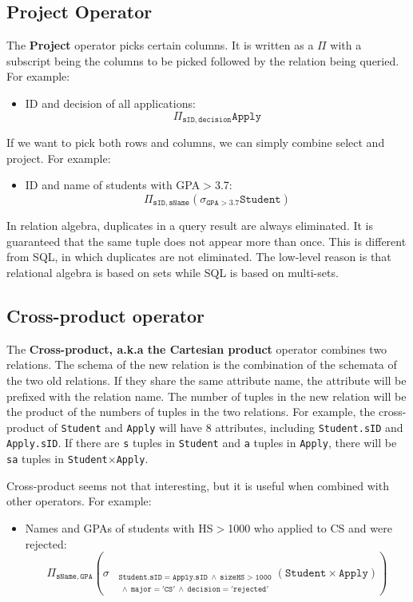 \subsection{Project Operator}
The \textbf{Project} operator picks certain columns. It is written as a $\Pi$ with a subscript being the columns to be picked followed by the relation being queried. For example:
\begin{itemize}
\item ID and decision of all applications: $$\mathtt{\Pi_{sID, decision}Apply}$$
\end{itemize}
If we want to pick both rows and columns, we can simply combine select and project. For example:
\begin{itemize}
\item ID and name of students with GPA$>$3.7:$$\mathtt{\Pi_{sID,sName}\left(\sigma_{GPA>3.7}Student\right)}$$
\end{itemize}
In relation algebra, duplicates in a query result are always eliminated. It is guaranteed that the same tuple does not appear more than once. This is different from SQL, in which duplicates are not eliminated. The low-level reason is that relational algebra is based on sets while SQL is based on multi-sets.
\subsection{Cross-product operator}
The \textbf{Cross-product, a.k.a the Cartesian product} operator combines two relations. The schema of the new relation is the combination of the schemata of the two old relations. If they share the same attribute name, the attribute will be prefixed with the relation name. The number of tuples in the new relation will be the product of the numbers of tuples in the two relations. For example, the cross-product of \texttt{Student} and \texttt{Apply} will have 8 attributes, including \texttt{Student.sID} and \texttt{Apply.sID}. If there are \texttt{s} tuples in \texttt{Student} and \texttt{a} tuples in \texttt{Apply}, there will be \texttt{sa} tuples in \texttt{Student$\times$Apply}.

Cross-product seems not that interesting, but it is useful when combined with other operators. For example:
\begin{itemize}
\item Names and GPAs of students with HS$>$1000 who applied to CS and were rejected:
\begin{equation*}
\mathtt{\Pi_{sName,GPA}\left(\sigma_{
\begin{aligned}
&\mathtt{\scriptstyle Student.sID=Apply.sID\:\land\: sizeHS>1000}\\
&\mathtt{\scriptstyle\:\land\: major='CS'\:\land\: decision='rejected'}
\end{aligned}
}\left(Student\times Apply\right)\right)}
\end{equation*}
\end{itemize}
